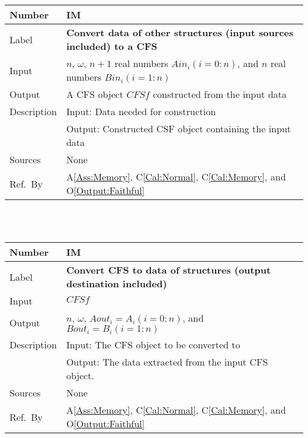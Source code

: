 \documentclass[12pt]{article}
\newcommand{\colAwidth}{0.13\textwidth}
\newcommand{\colBwidth}{0.82\textwidth}
\newcommand{\aref}[1]{A\ref{#1}}
\newcommand{\calref}[1]{C\ref{#1}}
\newcommand{\oref}[1]{O\ref{#1}}
\newcounter{instnum} %
\begin{document}
\noindent
\begin{minipage}{\textwidth}
	\renewcommand*{\arraystretch}{1.5}
	\begin{tabular}{| p{\colAwidth} | p{\colBwidth}|}
		\hline
		\rowcolor[gray]{0.9}
		Number& IM{instnum}\theinstnum 
		\label{IM:ConvertTo}\\
		\hline
		Label& \bf Convert data of other structures 
		(input sources included) to a CFS \\
		\hline
		Input& $n$, $\omega$, $n+1$ real numbers $\mathit{Ain}_{i} 
		(i=0:n)$, and $n$ real numbers $\mathit{Bin}_{i} (i=1:n)$\\
		\hline
		Output& A CFS object $\mathit{CFSf}$ constructed from 
		the input data\\
		\hline
		Description&Input: Data needed for construction\\
		&Output: Constructed CSF object containing the input data\\
		\hline
		Sources&None		\\
		\hline
		Ref.\ By &  \aref{Ass:Memory}, \calref{Cal:Normal}, 
		\calref{Cal:Memory}, and \oref{Output:Faithful}\\
		\hline
	\end{tabular}
\end{minipage}\\
~\newline

\noindent
\begin{minipage}{\textwidth}
	\renewcommand*{\arraystretch}{1.5}
	\begin{tabular}{| p{\colAwidth} | p{\colBwidth}|}
		\hline
		\rowcolor[gray]{0.9}
		Number& IM{instnum}\theinstnum 
		\label{IM:ConvertFrom}\\
		\hline
		Label& \bf Convert CFS to data of structures 
		(output destination included) \\
		\hline
		Input& $\mathit{CFSf}$\\
		\hline
		Output& $n$, $\omega$, $\mathit{Aout}_{i}=A_i (i=0:n)$, 
		and $\mathit{Bout}_{i}=B_i (i=1:n)$\\
		\hline
		Description&Input: The CFS object to be converted to\\
		&Output: The data extracted from the input CFS object.\\
		\hline
		Sources&None\\
		\hline
		Ref.\ By &   \aref{Ass:Memory}, \calref{Cal:Normal}, 
		\calref{Cal:Memory}, and \oref{Output:Faithful}\\
		\hline
	\end{tabular}
\end{minipage}\\
~\newline
\end{document}
